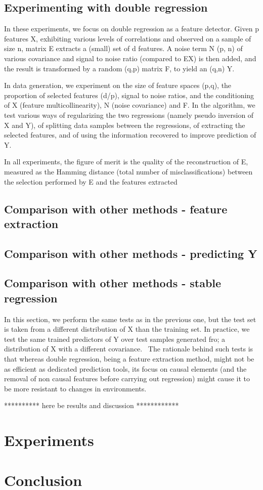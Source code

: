 \documentclass{article}
\begin{document}
\subsection{Experimenting with double regression}
In these experiments, we focus on double regression as a feature detector. Given p features X, exhibiting various levels of correlations and observed on a sample of size n, matrix E extracts a (small) set of d features. A noise term N (p, n) of various covariance and signal to noise ratio (compared to EX) is then added, and the result is transformed by a random (q,p) matrix F, to yield an (q,n) Y.

In data generation, we experiment on the size of feature spaces (p,q), the proportion of selected features (d/p), signal to noise ratios, and the conditioning of X (feature multicollinearity), N (noise covariance) and F. In the algorithm, we test various ways of regularizing the two regressions (namely pseudo inversion of X and Y), of splitting data samples between the regressions, of extracting the selected features, and of using the information recovered to improve prediction of Y.

In all experiments, the figure of merit is the quality of the reconstruction of E, measured as the Hamming distance (total number of misclassifications) between the selection performed by E and the features extracted 

\subsection{Comparison with other methods - feature extraction}

\subsection{Comparison with other methods - predicting Y}

\subsection{Comparison with other methods - stable regression}
In this section, we perform the same tests as in the previous one, but the test set is taken from a different distribution of X than the training set. In practice, we test the same trained predictors of Y over test samples generated fro; a distribution of X with a different covariance.
\
The rationale behind such tests is that whereas double regression, being a feature extraction method, might not be as efficient as dedicated prediction tools, its focus on causal elements (and the removal of non causal features before carrying out regression) might cause it to be more resistant to changes in environments. 

********** here be results and discussion ************

\section{Experiments}

\section{Conclusion}

\clearpage
\newpage



\end{document}
